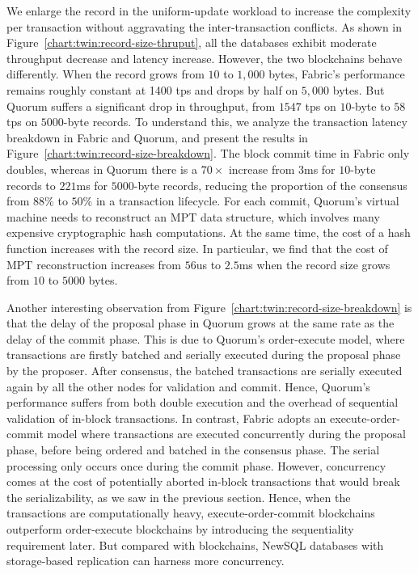 We enlarge the record in the uniform-update workload to increase the complexity
per transaction without aggravating the inter-transaction conflicts.
As shown in Figure~\ref{chart:twin:record-size-thruput}, all the databases exhibit
moderate throughput decrease and latency increase.
However, the two blockchains behave differently.
When the record grows from $10$ to $1,000$ bytes, Fabric's performance remains
roughly constant at 1400 tps and drops by half on $5,000$ bytes.
But Quorum suffers a significant drop in throughput, from $1547$ tps on
$10$-byte to $58$ tps on $5000$-byte records.
To understand this, we analyze the transaction latency breakdown in Fabric and
Quorum, and present the results in Figure~\ref{chart:twin:record-size-breakdown}.
The block commit time in Fabric only doubles, whereas in Quorum there is a
$70\times$ increase from $3$ms for $10$-byte records to $221$ms for $5000$-byte
records, reducing the proportion of the consensus from $88\%$ to $50\%$ in a
transaction lifecycle.
For each commit, Quorum's virtual machine needs to reconstruct an MPT data
structure, which involves many expensive cryptographic hash computations.
At the same time, the cost of a hash function increases with the record size.
In particular, we find that the cost of MPT reconstruction increases from $56$us
to $2.5$ms when the record size grows from $10$ to $5000$ bytes.

Another interesting observation from Figure~\ref{chart:twin:record-size-breakdown} is
that the delay of the proposal phase in Quorum grows at the same rate as the
delay of the commit phase.
This is due to Quorum's order-execute model, where transactions are firstly
batched and serially executed during the proposal phase by the proposer.
After consensus, the batched transactions are serially executed again by all the
other nodes for validation and commit.
Hence, Quorum's performance suffers from both double execution and the overhead
of sequential validation of in-block transactions.
In contrast, Fabric adopts an execute-order-commit model where transactions are
executed concurrently during the proposal phase, before being ordered and
batched in the consensus phase. 
The serial processing only occurs once during the commit phase. 
However, concurrency comes at the cost of potentially aborted in-block
transactions that would break the serializability, as we saw in the previous
section.
Hence, when the transactions are computationally heavy, execute-order-commit
blockchains outperform order-execute blockchains by introducing the
sequentiality requirement later.
But compared with blockchains, NewSQL databases with storage-based replication
can harness more concurrency.

